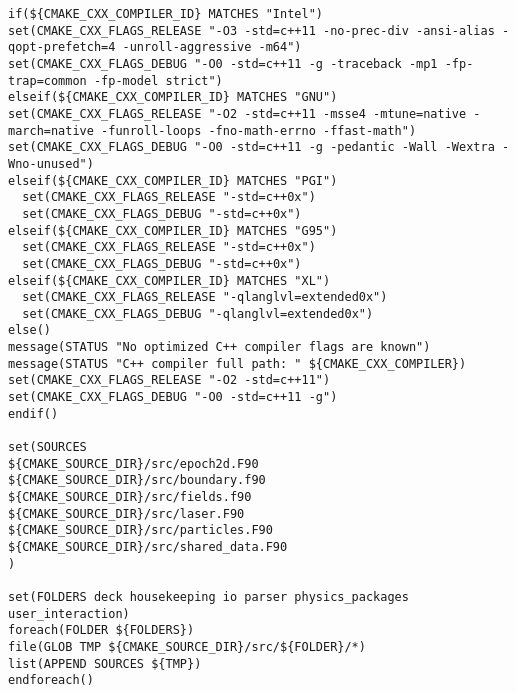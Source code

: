 \begin{lstlisting}[style=FORTRAN, caption=CMakeLists]
if(${CMAKE_CXX_COMPILER_ID} MATCHES "Intel")
set(CMAKE_CXX_FLAGS_RELEASE "-O3 -std=c++11 -no-prec-div -ansi-alias -qopt-prefetch=4 -unroll-aggressive -m64")
set(CMAKE_CXX_FLAGS_DEBUG "-O0 -std=c++11 -g -traceback -mp1 -fp-trap=common -fp-model strict")
elseif(${CMAKE_CXX_COMPILER_ID} MATCHES "GNU")
set(CMAKE_CXX_FLAGS_RELEASE "-O2 -std=c++11 -msse4 -mtune=native -march=native -funroll-loops -fno-math-errno -ffast-math")
set(CMAKE_CXX_FLAGS_DEBUG "-O0 -std=c++11 -g -pedantic -Wall -Wextra -Wno-unused")
elseif(${CMAKE_CXX_COMPILER_ID} MATCHES "PGI")
  set(CMAKE_CXX_FLAGS_RELEASE "-std=c++0x")
  set(CMAKE_CXX_FLAGS_DEBUG "-std=c++0x")
elseif(${CMAKE_CXX_COMPILER_ID} MATCHES "G95")
  set(CMAKE_CXX_FLAGS_RELEASE "-std=c++0x")
  set(CMAKE_CXX_FLAGS_DEBUG "-std=c++0x")
elseif(${CMAKE_CXX_COMPILER_ID} MATCHES "XL")
  set(CMAKE_CXX_FLAGS_RELEASE "-qlanglvl=extended0x")
  set(CMAKE_CXX_FLAGS_DEBUG "-qlanglvl=extended0x")
else()
message(STATUS "No optimized C++ compiler flags are known")
message(STATUS "C++ compiler full path: " ${CMAKE_CXX_COMPILER})
set(CMAKE_CXX_FLAGS_RELEASE "-O2 -std=c++11")
set(CMAKE_CXX_FLAGS_DEBUG "-O0 -std=c++11 -g")
endif()

set(SOURCES
${CMAKE_SOURCE_DIR}/src/epoch2d.F90
${CMAKE_SOURCE_DIR}/src/boundary.f90
${CMAKE_SOURCE_DIR}/src/fields.f90
${CMAKE_SOURCE_DIR}/src/laser.F90
${CMAKE_SOURCE_DIR}/src/particles.F90
${CMAKE_SOURCE_DIR}/src/shared_data.F90
)

set(FOLDERS deck housekeeping io parser physics_packages user_interaction)
foreach(FOLDER ${FOLDERS})
file(GLOB TMP ${CMAKE_SOURCE_DIR}/src/${FOLDER}/*)
list(APPEND SOURCES ${TMP})
endforeach()


\end{lstlisting}
